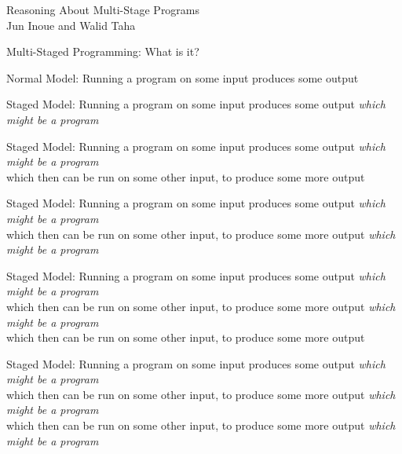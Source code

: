 \documentclass{beamer}
\begin{document}
\begin{centering}
\begin{frame}
Reasoning About Multi-Stage Programs\\
Jun Inoue and Walid Taha\\
\end{frame}

\begin{frame}
Multi-Staged Programming: What is it?
\end{frame}
\end{centering}

\begin{frame}
Normal Model: Running a program on some input produces some output
\end{frame}

\begin{frame}
Staged Model: Running a program on some input produces some output \textit{which might be a program}
\end{frame}

\begin{frame}
Staged Model: Running a program on some input produces some output \textit{which might be a program}\\
which then can be run on some other input, to produce some more output
\end{frame}

\begin{frame}
Staged Model: Running a program on some input produces some output \textit{which might be a program}\\
which then can be run on some other input, to produce some more output \textit{which might be a program}\\
\end{frame}

\begin{frame}
Staged Model: Running a program on some input produces some output \textit{which might be a program}\\
which then can be run on some other input, to produce some more output \textit{which might be a program}\\
which then can be run on some other input, to produce some more output
\end{frame}

\begin{frame}
Staged Model: Running a program on some input produces some output \textit{which might be a program}\\
which then can be run on some other input, to produce some more output \textit{which might be a program}\\
which then can be run on some other input, to produce some more output \textit{which might be a program}\\
\end{frame}
\end{document}
